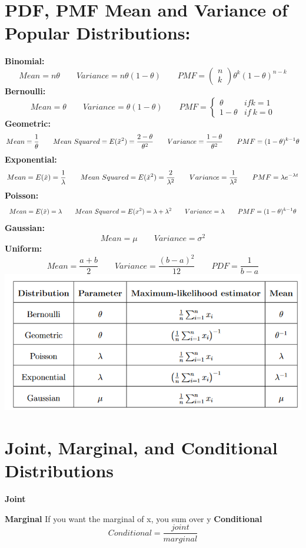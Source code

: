 \documentclass[12pt,twoside]{article}
\newcommand{\rnd}{\Tilde}
\newcommand{\rx}{\rnd{ x}  }
\begin{document}
\section*{PDF, PMF Mean and Variance of Popular Distributions:}
\textbf{Binomial:} 
$$Mean = n\theta \qquad Variance = n\theta(1-\theta) \qquad PMF = \begin{pmatrix} n \\ k \end{pmatrix} \theta^k(1-\theta)^{n-k}$$
\textbf{Bernoulli:} 
$$Mean = \theta \qquad Variance = \theta(1-\theta) \qquad PMF = \begin{cases} \theta & if k=1 \\ 1-\theta & if \ k=0 \end{cases}$$
\textbf{Geometric:} 
$$Mean = \frac{1}{\theta} \qquad Mean \ Squared = E(\rx^2) = \frac{2-\theta}{\theta^2} \qquad Variance = \frac{1-\theta}{\theta^2} \qquad PMF = (1-\theta)^{k-1}\theta$$
\textbf{Exponential:} 
$$Mean = E(\rx) = \frac{1}{\lambda} \qquad Mean \ Squared = E(\rx^2) = \frac{2}{\lambda^2}\qquad Variance = \frac{1}{\lambda^2} \qquad PMF = \lambda e^{-\lambda t}$$
\textbf{Poisson:} 
$$Mean = E(\rx) = \lambda \qquad Mean \ Squared = E(x^2) = \lambda + \lambda^2 \qquad Variance = \lambda \qquad PMF = (1-\theta)^{k-1}\theta$$
\textbf{Gaussian:} 
$$Mean = \mu \qquad Variance = \sigma^2$$
\textbf{Uniform:} 
$$Mean = \frac{a+b}{2} \qquad Variance = \frac{(b-a)^2}{12} \qquad PDF = \frac{1}{b-a}$$
\includegraphics[scale=.8]{mean of distributions.png}

\section*{Joint, Marginal, and Conditional Distributions}
\textbf{Joint}

\textbf{Marginal} If you want the marginal of x, you sum over y
\textbf{Conditional} $$
    Conditional = \frac{joint}{marginal}
$$
\end{document}

